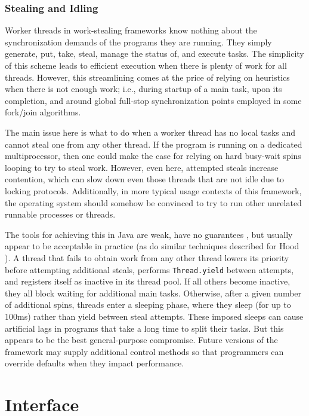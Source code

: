 \subsubsection{Stealing and Idling}

Worker threads in work-stealing frameworks know nothing about the
synchronization demands of the programs they are running. They simply
generate, put, take, steal, manage the status of, and execute
tasks. The simplicity of this scheme leads to efficient execution when
there is plenty of work for all threads. However, this streamlining
comes at the price of relying on heuristics when there is not enough
work; i.e., during startup of a main task, upon its completion, and
around global full-stop synchronization points employed in some
fork/join algorithms.

The main issue here is what to do when a worker thread has no local
tasks and cannot steal one from any other thread. If the program is
running on a dedicated multiprocessor, then one could make the case
for relying on hard busy-wait spins looping to try to steal
work. However, even here, attempted steals increase contention, which
can slow down even those threads that are not idle due to locking
protocols.  Additionally, in more typical usage contexts of this
framework, the operating system should somehow be convinced to try to
run other unrelated runnable processes or threads.

The tools for achieving this in Java are weak, have no guarantees
\cite{Goetz2006}, but usually appear to be acceptable in practice (as
do similar techniques described for Hood \cite{Blumofe1998}). A thread
that fails to obtain work from any other thread lowers its priority
before attempting additional steals, performs \lstinline!Thread.yield!
between attempts, and registers itself as inactive in its thread
pool. If all others become inactive, they all block waiting for
additional main tasks. Otherwise, after a given number of additional
spins, threads enter a sleeping phase, where they sleep (for up to
100ms) rather than yield between steal attempts. These imposed sleeps
can cause artificial lags in programs that take a long time to split
their tasks. But this appears to be the best general-purpose
compromise. Future versions of the framework may supply additional
control methods so that programmers can override defaults when they
impact performance.

\section{Interface}
\label{sec:queues-description-interface}

